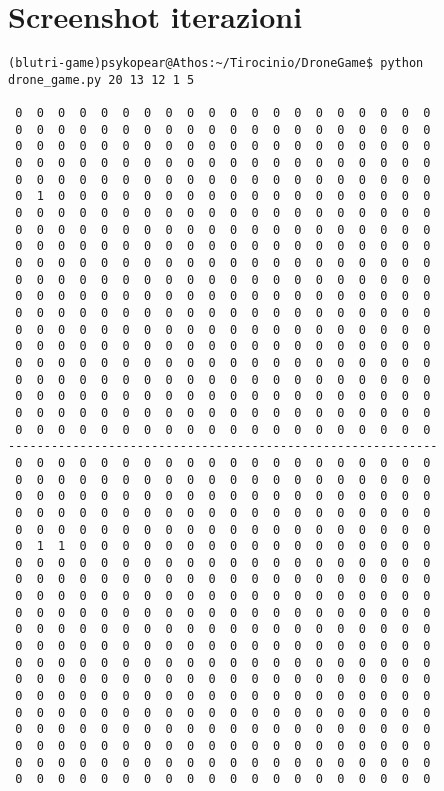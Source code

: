 \section{Screenshot iterazioni}

\begin{verbatim}
(blutri-game)psykopear@Athos:~/Tirocinio/DroneGame$ python drone_game.py 20 13 12 1 5

 0  0  0  0  0  0  0  0  0  0  0  0  0  0  0  0  0  0  0  0
 0  0  0  0  0  0  0  0  0  0  0  0  0  0  0  0  0  0  0  0
 0  0  0  0  0  0  0  0  0  0  0  0  0  0  0  0  0  0  0  0
 0  0  0  0  0  0  0  0  0  0  0  0  0  0  0  0  0  0  0  0
 0  0  0  0  0  0  0  0  0  0  0  0  0  0  0  0  0  0  0  0
 0  1  0  0  0  0  0  0  0  0  0  0  0  0  0  0  0  0  0  0
 0  0  0  0  0  0  0  0  0  0  0  0  0  0  0  0  0  0  0  0
 0  0  0  0  0  0  0  0  0  0  0  0  0  0  0  0  0  0  0  0
 0  0  0  0  0  0  0  0  0  0  0  0  0  0  0  0  0  0  0  0
 0  0  0  0  0  0  0  0  0  0  0  0  0  0  0  0  0  0  0  0
 0  0  0  0  0  0  0  0  0  0  0  0  0  0  0  0  0  0  0  0
 0  0  0  0  0  0  0  0  0  0  0  0  0  0  0  0  0  0  0  0
 0  0  0  0  0  0  0  0  0  0  0  0  0  0  0  0  0  0  0  0
 0  0  0  0  0  0  0  0  0  0  0  0  0  0  0  0  0  0  0  0
 0  0  0  0  0  0  0  0  0  0  0  0  0  0  0  0  0  0  0  0
 0  0  0  0  0  0  0  0  0  0  0  0  0  0  0  0  0  0  0  0
 0  0  0  0  0  0  0  0  0  0  0  0  0  0  0  0  0  0  0  0
 0  0  0  0  0  0  0  0  0  0  0  0  0  0  0  0  0  0  0  0
 0  0  0  0  0  0  0  0  0  0  0  0  0  0  0  0  0  0  0  0
 0  0  0  0  0  0  0  0  0  0  0  0  0  0  0  0  0  0  0  0
------------------------------------------------------------
 0  0  0  0  0  0  0  0  0  0  0  0  0  0  0  0  0  0  0  0
 0  0  0  0  0  0  0  0  0  0  0  0  0  0  0  0  0  0  0  0
 0  0  0  0  0  0  0  0  0  0  0  0  0  0  0  0  0  0  0  0
 0  0  0  0  0  0  0  0  0  0  0  0  0  0  0  0  0  0  0  0
 0  0  0  0  0  0  0  0  0  0  0  0  0  0  0  0  0  0  0  0
 0  1  1  0  0  0  0  0  0  0  0  0  0  0  0  0  0  0  0  0
 0  0  0  0  0  0  0  0  0  0  0  0  0  0  0  0  0  0  0  0
 0  0  0  0  0  0  0  0  0  0  0  0  0  0  0  0  0  0  0  0
 0  0  0  0  0  0  0  0  0  0  0  0  0  0  0  0  0  0  0  0
 0  0  0  0  0  0  0  0  0  0  0  0  0  0  0  0  0  0  0  0
 0  0  0  0  0  0  0  0  0  0  0  0  0  0  0  0  0  0  0  0
 0  0  0  0  0  0  0  0  0  0  0  0  0  0  0  0  0  0  0  0
 0  0  0  0  0  0  0  0  0  0  0  0  0  0  0  0  0  0  0  0
 0  0  0  0  0  0  0  0  0  0  0  0  0  0  0  0  0  0  0  0
 0  0  0  0  0  0  0  0  0  0  0  0  0  0  0  0  0  0  0  0
 0  0  0  0  0  0  0  0  0  0  0  0  0  0  0  0  0  0  0  0
 0  0  0  0  0  0  0  0  0  0  0  0  0  0  0  0  0  0  0  0
 0  0  0  0  0  0  0  0  0  0  0  0  0  0  0  0  0  0  0  0
 0  0  0  0  0  0  0  0  0  0  0  0  0  0  0  0  0  0  0  0
 0  0  0  0  0  0  0  0  0  0  0  0  0  0  0  0  0  0  0  0
\end{verbatim}
